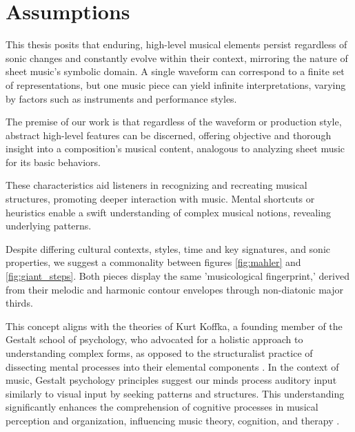 \section{Assumptions}

This thesis posits that enduring, high-level musical elements persist regardless of sonic changes and constantly evolve within their context, mirroring the nature of sheet music's symbolic domain. A single waveform can correspond to a finite set of representations, but one music piece can yield infinite interpretations, varying by factors such as instruments and performance styles.

The premise of our work is that regardless of the waveform or production style, abstract high-level features can be discerned, offering objective and thorough insight into a composition's musical content, analogous to analyzing sheet music for its basic behaviors.

These characteristics aid listeners in recognizing and recreating musical structures, promoting deeper interaction with music. Mental shortcuts or heuristics enable a swift understanding of complex musical notions, revealing underlying patterns.

Despite differing cultural contexts, styles, time and key signatures, and sonic properties, we suggest a commonality between figures \ref{fig:mahler} and \ref{fig:giant_steps}. Both pieces display the same 'musicological fingerprint,' derived from their melodic and harmonic contour envelopes through non-diatonic major thirds.

This concept aligns with the theories of Kurt Koffka, a founding member of the Gestalt school of psychology, who advocated for a holistic approach to understanding complex forms, as opposed to the structuralist practice of dissecting mental processes into their elemental components \cite{Koffka2013PrinciplesPsychology}. In the context of music, Gestalt psychology principles suggest our minds process auditory input similarly to visual input by seeking patterns and structures. This understanding significantly enhances the comprehension of cognitive processes in musical perception and organization, influencing music theory, cognition, and therapy \cite{Lerdahl1985AMusic}.

